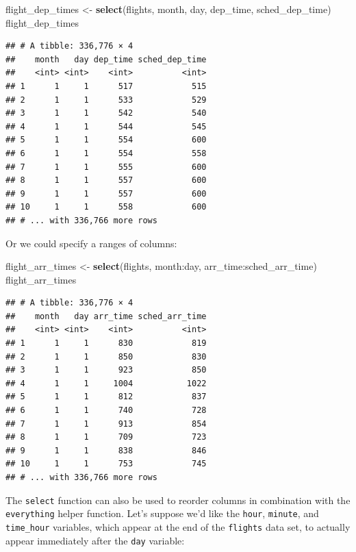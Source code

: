 \documentclass[]{tufte-book}
\newenvironment{Shaded}{\begin{snugshade}}{\end{snugshade}}
\newcommand{\KeywordTok}[1]{\textcolor[rgb]{0.13,0.29,0.53}{\textbf{{#1}}}}
\newcommand{\StringTok}[1]{\textcolor[rgb]{0.31,0.60,0.02}{{#1}}}
\newcommand{\NormalTok}[1]{{#1}}
\begin{document}
\begin{Shaded}
\begin{Highlighting}[]
\NormalTok{flight_dep_times <-}\StringTok{ }\KeywordTok{select}\NormalTok{(flights, month, day, dep_time, sched_dep_time)}
\NormalTok{flight_dep_times}
\end{Highlighting}
\end{Shaded}

\begin{verbatim}
## # A tibble: 336,776 × 4
##    month   day dep_time sched_dep_time
##    <int> <int>    <int>          <int>
## 1      1     1      517            515
## 2      1     1      533            529
## 3      1     1      542            540
## 4      1     1      544            545
## 5      1     1      554            600
## 6      1     1      554            558
## 7      1     1      555            600
## 8      1     1      557            600
## 9      1     1      557            600
## 10     1     1      558            600
## # ... with 336,766 more rows
\end{verbatim}

Or we could specify a ranges of columns:

\begin{Shaded}
\begin{Highlighting}[]
\NormalTok{flight_arr_times <-}\StringTok{ }\KeywordTok{select}\NormalTok{(flights, month:day, arr_time:sched_arr_time)}
\NormalTok{flight_arr_times}
\end{Highlighting}
\end{Shaded}

\begin{verbatim}
## # A tibble: 336,776 × 4
##    month   day arr_time sched_arr_time
##    <int> <int>    <int>          <int>
## 1      1     1      830            819
## 2      1     1      850            830
## 3      1     1      923            850
## 4      1     1     1004           1022
## 5      1     1      812            837
## 6      1     1      740            728
## 7      1     1      913            854
## 8      1     1      709            723
## 9      1     1      838            846
## 10     1     1      753            745
## # ... with 336,766 more rows
\end{verbatim}

The \texttt{select} function can also be used to reorder columns in
combination with the \texttt{everything} helper function. Let's suppose
we'd like the \texttt{hour}, \texttt{minute}, and \texttt{time\_hour}
variables, which appear at the end of the \texttt{flights} data set, to
actually appear immediately after the \texttt{day} variable:
\end{document}
